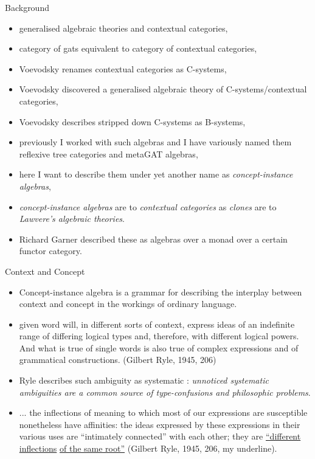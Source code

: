 \begin{frame}{Background}
\begin{itemize}
\item generalised algebraic theories and contextual categories,
\item category of gats equivalent to category of contextual categories,
\item Voevodsky renames contextual categories as C-systems,
\item Voevodsky discovered a generalised algebraic theory of C-systems/contextual categories,
\item Voevodsky describes stripped down  C-systems as B-systems,
\item previously I worked with such algebras and I have variously named them reflexive tree categories and metaGAT algebras,
\item here I want to describe them under yet another name as \textit{concept-instance algebras},
\item \textit{concept-instance algebras} are to \textit{contextual categories} as \textit{clones} are to \textit{Lawvere's  algebraic theories}.
\item Richard Garner described these as algebras over a monad over a certain functor category.
\end{itemize}
\end{frame}

\begin{frame}{Context and Concept}
\begin{itemize}
	\item Concept-instance algebra is a grammar for describing the interplay between context and concept in the workings of ordinary language.
\pause	\item
\begin{tightquote}
[a] given word will, in different sorts of context, express ideas of an indefinite range of differing logical types and, therefore, with different logical powers. And what is true of single words is also true of complex expressions and of grammatical constructions. (Gilbert Ryle, 1945, 206)
\end{tightquote}
\medskip
\item Ryle describes such ambiguity as systematic : \textit{unnoticed systematic ambiguities are a common source of type-confusions and philosophic problems}.
\end{itemize}
\end{frame}
\begin{frame}
\begin{itemize}
\item 
\begin{tightquote}
... the inflections of meaning to which most of our expressions are susceptible nonetheless have affinities: the ideas expressed by these expressions in their various uses are “intimately connected” with each other; 
they are \underline{“different inflections} \underline{of the same root”} (Gilbert Ryle, 1945, 206, my underline).
\end{tightquote}

\end{itemize}
\end{frame}


